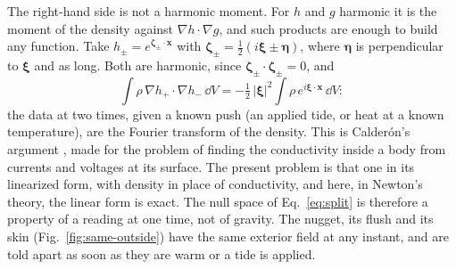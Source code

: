 The right-hand side is not a harmonic moment. For $h$
and $g$ harmonic it is the moment of the density against
$\nabla h\cdot\nabla g$, and such products are enough to build any function.
Take $h_\pm = e^{\boldsymbol\zeta_\pm\cdot\mathbf x}$ with
$\boldsymbol\zeta_\pm = \tfrac12(i\boldsymbol\xi \pm \boldsymbol\eta)$, where
$\boldsymbol\eta$ is perpendicular to $\boldsymbol\xi$ and as long. Both are
harmonic, since $\boldsymbol\zeta_\pm\cdot\boldsymbol\zeta_\pm = 0$, and
\begin{equation}\label{eq:calderon}
\int\rho\,\nabla h_+\cdot\nabla h_-\,\dd V
= -\tfrac12\,|\boldsymbol\xi|^2\int\rho\,e^{i\boldsymbol\xi\cdot\mathbf x}\,\dd V :
\end{equation}
the data at two times, given a known push (an applied tide, or heat at a known
temperature), are the Fourier transform of the density. This is
Calder\'on's argument \cite{Calderon1980}, made for the problem of finding the
conductivity inside a body from currents and voltages at its surface. The
present problem is that one in its linearized form, with density in place of conductivity, and
here, in Newton's theory, the linear form is exact. The null space of
Eq.~\eqref{eq:split} is therefore a property of a reading at one time, not of
gravity. The
nugget, its flush and its skin (Fig.~\ref{fig:same-outside}) have the same
exterior field at any instant, and are told apart as soon as they are warm or
a tide is applied.

